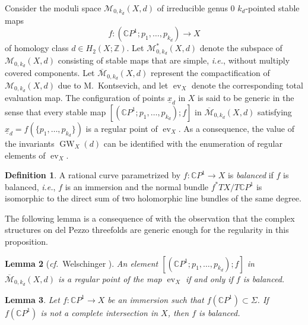 \documentclass[11pt]{amsart}
\numberwithin{equation}{section}
\theoremstyle{definition}
\newtheorem{definition}{Definition}[section]
\theoremstyle{plain}
\newtheorem{lemma}[definition]{Lemma}
\theoremstyle{remark}
\newcommand{\Z}{\mathbb{Z}}
\newcommand{\C}{\mathbb{C}}
\DeclareMathOperator{\GW}{GW}
\DeclareMathOperator{\ev}{ev}
\newcommand{\lra}{\longrightarrow}
\begin{document}
Consider the moduli space $\mathcal{M}_{0,k_d}(X,d)$  of irreducible genus $0$ $k_d$-pointed stable maps
$$f\colon \left(\mathbb{C}P^1;p_1,\ldots,p_{k_d}\right)\lra X$$
of homology class $d\in H_2(X;\Z)$. Let $\mathcal{M}^*_{0,k_d}(X,d)$ denote the subspace of $\mathcal{M}_{0,k_d}(X,d)$ consisting of  
stable maps  that are simple, \textit{i.e.}, without multiply covered components. Let $\overline{\mathcal{M}}_{0,k_d}(X,d)$ represent the compactification of  $\mathcal{M}_{0,k_d}(X,d)$ due to M.~Kontsevich, and let $\ev_X$ denote the corresponding total evaluation map. The configuration of points $\underline{x}_d$ in $X$ is said to be generic in the sense that every stable map $[(\C P^1;p_1,\ldots,p_{k_d});f]$ in $\overline{\mathcal{M}}_{0,k_d}(X,d)$ satisfying   $\underline{x}_d=f(\{p_1,\ldots,p_{k_d}\})$ is a regular point of  $\ev_{X}$. As a consequence, the value of the invariants $\GW_X(d)$ can be identified with the enumeration of regular elements of $\ev_{X}$.

\begin{definition}
A rational curve parametrized by $f\colon \C P^1\to X$  is \emph{balanced} if $f$ is balanced, \textit{i.e.}, $f$ is an immersion and the normal bundle  $f^*TX/T\C P^1$ is isomorphic to the direct sum of two holomorphic line bundles of the same degree.
\end{definition}

The following lemma is a consequence of \cite[Proposition 2.2]{welschinger2005stongly} with the observation that the complex structures on del Pezzo threefolds are generic enough for the regularity in this proposition. 

\begin{lemma}[\textit{cf.}~Welschinger \cite{welschinger2005stongly}] \label{Lemma-Regular.Balanced} 
An element $[(\C P^1;p_1,\ldots,p_{k_d});f]$ in $\overline{\mathcal{M}}_{0,k_d}(X,d)$ is a regular point of the map $\ev_{X}$ if and only if $f$ is balanced.
\end{lemma}

 \begin{lemma} \label{Lemma-not.intersection.balanced}
  Let $f\colon \mathbb{C}P^1\to X$ be an immersion such that $f(\C P^1)\subset \Sigma$. If $f(\C P^1)$ is not a complete intersection in $X$, then $f$ is balanced.
   \end{lemma}    
\end{document}

